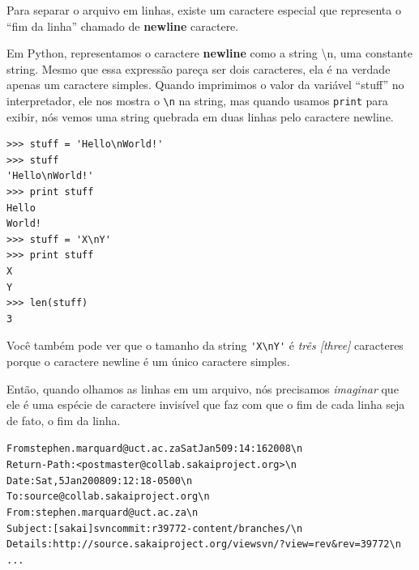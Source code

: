 Para separar o arquivo em linhas, existe um caractere especial que
representa o ``fim da linha'' chamado de {\bf newline} caractere.


Em Python, representamos o caractere {\bf newline} como a string \textbackslash n,
uma constante string. Mesmo que essa expressão pareça ser dois caracteres, ela
é na verdade apenas um caractere simples. Quando imprimimos o valor da variável
``stuff'' no interpretador, ele nos mostra o \verb"\n" na string,
mas quando usamos {\tt print} para exibir, nós vemos uma string quebrada
em duas linhas pelo caractere newline.

\beforeverb
\begin{verbatim}
>>> stuff = 'Hello\nWorld!'
>>> stuff
'Hello\nWorld!'
>>> print stuff
Hello
World!
>>> stuff = 'X\nY'
>>> print stuff
X
Y
>>> len(stuff)
3
\end{verbatim}
\afterverb

Você também pode ver que o tamanho da string \verb"'X\nY'" é \emph{três [three]}
caracteres porque o caractere newline é um único caractere simples.

Então, quando olhamos as linhas em um arquivo, nós precisamos \emph{imaginar}
que ele é uma espécie de caractere invisível que faz com que o fim de cada linha
seja de fato, o fim da linha.

 \beforeverb
 \begin{alltt}
 From stephen.marquard@uct.ac.za Sat Jan  5 09:14:16 2008\verb"\n"\\
 Return-Path: <postmaster@collab.sakaiproject.org>\verb"\n"\\
 Date: Sat, 5 Jan 2008 09:12:18 -0500\verb"\n"\\
 To: source@collab.sakaiproject.org\verb"\n"\\
 From: stephen.marquard@uct.ac.za\verb"\n"\\
 Subject: [sakai] svn commit: r39772 - content/branches/\verb"\n"\\
 Details: http://source.sakaiproject.org/viewsvn/?view=rev\&rev=39772\verb"\n"\\
 ...
 \end{alltt}
 \afterverb

